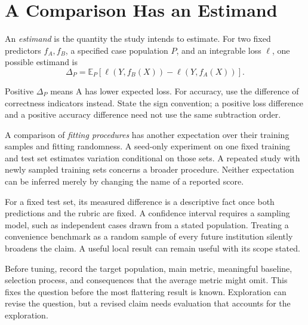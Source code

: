 \section{A Comparison Has an Estimand}

\par\noindent\begin{minipage}{\linewidth}
An \emph{estimand} is the quantity the study intends to estimate. For two fixed predictors $f_A,f_B$, a specified case population $P$, and an integrable loss $\ell$, one possible estimand is
\[
\Delta_P=\mathbb E_P[\ell(Y,f_B(X))-\ell(Y,f_A(X))].
\]
\end{minipage}\par\addvspace{\belowdisplayskip}
Positive $\Delta_P$ means A has lower expected loss. For accuracy, use the difference of correctness indicators instead. State the sign convention; a positive loss difference and a positive accuracy difference need not use the same subtraction order.

A comparison of \emph{fitting procedures} has another expectation over their training samples and fitting randomness. A seed-only experiment on one fixed training and test set estimates variation conditional on those sets. A repeated study with newly sampled training sets concerns a broader procedure. Neither expectation can be inferred merely by changing the name of a reported score.

For a fixed test set, its measured difference is a descriptive fact once both predictions and the rubric are fixed. A confidence interval requires a sampling model, such as independent cases drawn from a stated population. Treating a convenience benchmark as a random sample of every future institution silently broadens the claim. A useful local result can remain useful with its scope stated.

\par\addvspace{\intextsep}\noindent\begin{minipage}{\linewidth}
\centering

\label{fig:experiment-workflow}
\end{minipage}\par\addvspace{\intextsep}

Before tuning, record the target population, main metric, meaningful baseline, selection process, and consequences that the average metric might omit. This fixes the question before the most flattering result is known. Exploration can revise the question, but a revised claim needs evaluation that accounts for the exploration.

